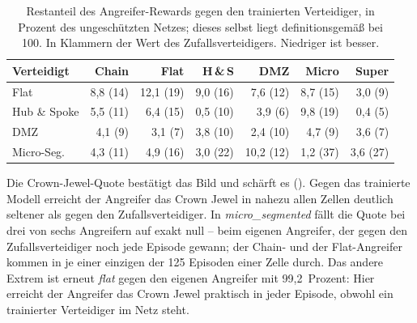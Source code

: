 \begin{table}[H]
  \centering
  \caption[Restanteil in der Evaluation]{Restanteil des Angreifer-Rewards
  gegen den trainierten Verteidiger, in
  Prozent des ungeschützten Netzes; dieses selbst liegt definitionsgemäß bei
  100. In Klammern der Wert des Zufallsverteidigers. Niedriger ist besser.}
  \label{tab:restanteil}
  \small
  \begin{tabular}{l*{6}{r}}
    \toprule
    Verteidigt & Chain & Flat & H\,\&\,S & DMZ & Micro & Super \\
    \midrule
    Flat         & 8,8 (14) & 12,1 (19) & 9,0 (16) & 7,6 (12) & 8,7 (15) & 3,0 (9)  \\
    Hub \& Spoke & 5,5 (11) & 6,4 (15)  & 0,5 (10) & 3,9 (6)  & 9,8 (19) & 0,4 (5)  \\
    DMZ          & 4,1 (9)  & 3,1 (7)   & 3,8 (10) & 2,4 (10) & 4,7 (9)  & 3,6 (7)  \\
    Micro-Seg.   & 4,3 (11) & 4,9 (16)  & 3,0 (22) & 10,2 (12)& 1,2 (37) & 3,6 (27) \\
    \bottomrule
  \end{tabular}
\end{table}

Die Crown-Jewel-Quote bestätigt das Bild und schärft es
(). Gegen das trainierte Modell erreicht der Angreifer das Crown Jewel in
nahezu allen Zellen deutlich seltener als gegen den Zufallsverteidiger. In
\emph{micro\_segmented} fällt die Quote bei drei von sechs Angreifern auf
exakt null -- beim eigenen Angreifer, der gegen den Zufallsverteidiger noch
jede Episode gewann; der Chain- und der Flat-Angreifer kommen in je einer
einzigen der 125 Episoden einer Zelle durch.
Das andere Extrem ist erneut \emph{flat} gegen den eigenen Angreifer mit
99,2~Prozent: Hier erreicht der Angreifer das Crown Jewel praktisch in jeder
Episode, obwohl ein trainierter Verteidiger im Netz steht.

